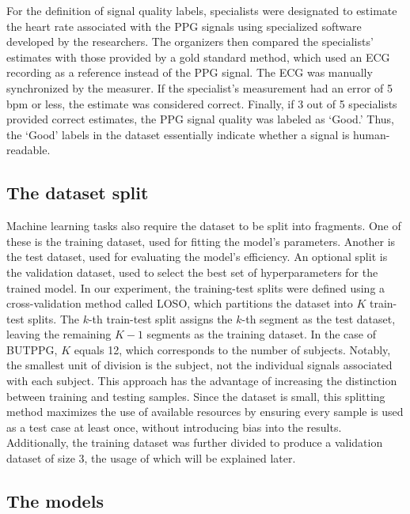 For the definition of signal quality labels, specialists were designated to estimate the heart rate associated with the \gls{PPG} signals using specialized software developed by the researchers. The organizers then compared the specialists' estimates with those provided by a gold standard method, which used an ECG recording as a reference instead of the \gls{PPG} signal. The ECG was manually synchronized by the measurer. If the specialist's measurement had an error of 5 bpm or less, the estimate was considered correct. Finally, if 3 out of 5 specialists provided correct estimates, the \gls{PPG} signal quality was labeled as `Good.' Thus, the `Good' labels in the dataset essentially indicate whether a signal is human-readable.

\subsection{The dataset split}

Machine learning tasks also require the dataset to be split into fragments. One of these is the training dataset, used for fitting the model's parameters. Another is the test dataset, used for evaluating the model's efficiency. An optional split is the validation dataset, used to select the best set of hyperparameters for the trained model. In our experiment, the training-test splits were defined using a cross-validation method called \gls{LOSO}, which partitions the dataset into $K$ train-test splits. The $k$-th train-test split assigns the $k$-th segment as the test dataset, leaving the remaining $K-1$ segments as the training dataset. In the case of \gls{BUTPPG}, $K$ equals 12, which corresponds to the number of subjects. Notably, the smallest unit of division is the subject, not the individual signals associated with each subject. This approach has the advantage of increasing the distinction between training and testing samples. Since the dataset is small, this splitting method maximizes the use of available resources by ensuring every sample is used as a test case at least once, without introducing bias into the results. Additionally, the training dataset was further divided to produce a validation dataset of size 3, the usage of which will be explained later.

\subsection{The models}

